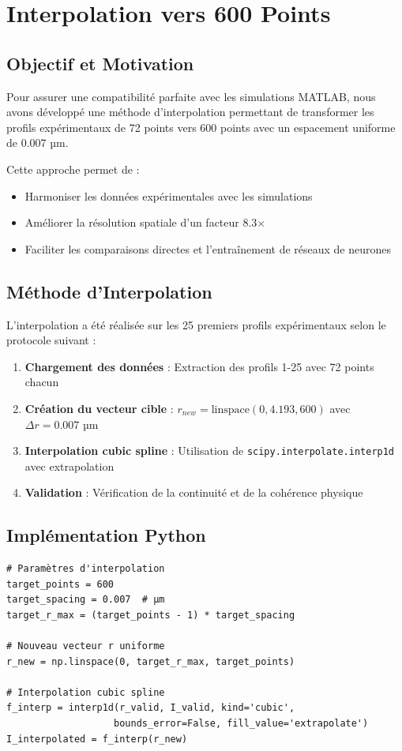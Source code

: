 \documentclass[twocolumn,10pt]{article}
\begin{document}
\section{Interpolation vers 600 Points}

\subsection{Objectif et Motivation}

Pour assurer une compatibilité parfaite avec les simulations MATLAB, nous avons développé une méthode d'interpolation permettant de transformer les profils expérimentaux de 72 points vers 600 points avec un espacement uniforme de 0.007 µm.

Cette approche permet de :
\begin{itemize}
\item Harmoniser les données expérimentales avec les simulations
\item Améliorer la résolution spatiale d'un facteur 8.3×
\item Faciliter les comparaisons directes et l'entraînement de réseaux de neurones
\end{itemize}

\subsection{Méthode d'Interpolation}

L'interpolation a été réalisée sur les 25 premiers profils expérimentaux selon le protocole suivant :

\begin{enumerate}
\item \textbf{Chargement des données} : Extraction des profils 1-25 avec 72 points chacun
\item \textbf{Création du vecteur cible} : $r_{new} = \text{linspace}(0, 4.193, 600)$ avec $\Delta r = 0.007$ µm
\item \textbf{Interpolation cubic spline} : Utilisation de \texttt{scipy.interpolate.interp1d} avec extrapolation
\item \textbf{Validation} : Vérification de la continuité et de la cohérence physique
\end{enumerate}

\subsection{Implémentation Python}

\begin{lstlisting}[style=python, caption=Algorithme d'interpolation vers 600 points]
# Paramètres d'interpolation
target_points = 600
target_spacing = 0.007  # µm
target_r_max = (target_points - 1) * target_spacing

# Nouveau vecteur r uniforme
r_new = np.linspace(0, target_r_max, target_points)

# Interpolation cubic spline
f_interp = interp1d(r_valid, I_valid, kind='cubic',
                   bounds_error=False, fill_value='extrapolate')
I_interpolated = f_interp(r_new)
\end{lstlisting}
\end{document}
